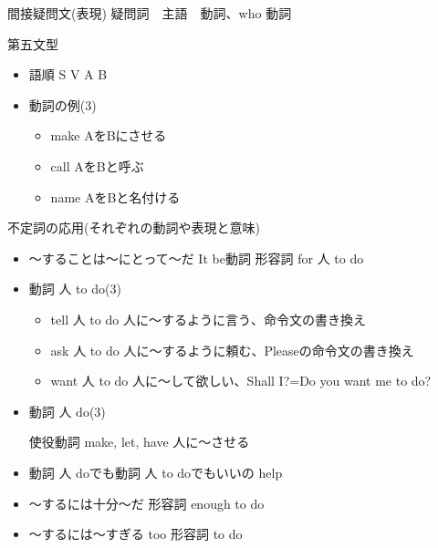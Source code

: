 \documentclass[10pt]{jsarticle}
\newcommand{\answer}[2]{{\color{orange}#2}}
\newcommand{\answer}[2]{\vspace{#1mm}}
\begin{document}
\begin{itembox}[l]{間接疑問文(表現)}
	\answer{10}{疑問詞　主語　動詞、who 動詞}
\end{itembox}

\begin{itembox}[l]{第五文型}
	\begin{itemize}
		\item 語順 \answer{10}{S V A B}
		\item 動詞の例(3)\answer{20}{
		\begin{multicols}{3}
		\begin{itemize}
			\item make \answer{5}{AをBにさせる}
			\item call \answer{5}{AをBと呼ぶ}
			\item name \answer{5}{AをBと名付ける}
		\end{itemize}
	\end{multicols}
	}
	\end{itemize}
\end{itembox}

\begin{itembox}[l]{不定詞の応用(それぞれの動詞や表現と意味)}
	\begin{itemize}
		\item 〜することは〜にとって〜だ \answer{10}{It be動詞 形容詞 for 人 to do}
		\item 動詞 人 to do(3)\answer{20}{
		\begin{itemize}
			\item tell 人 to do 人に〜するように言う、命令文の書き換え
			\item ask 人 to do 人に〜するように頼む、Pleaseの命令文の書き換え
						\item want 人 to do 人に〜して欲しい、Shall I?=Do you want me to do?		
\end{itemize}

}
\item 動詞 人 do(3)\answer{20}{
使役動詞 make, let, have 人に〜させる

}

		\item 動詞 人 doでも動詞 人 to doでもいいの \answer{10}{help}
		\item 〜するには十分〜だ \answer{5}{形容詞 enough to do}
		\item 〜するには〜すぎる \answer{5}{too 形容詞 to do}
	\end{itemize}
\end{itembox}
\end{document}
